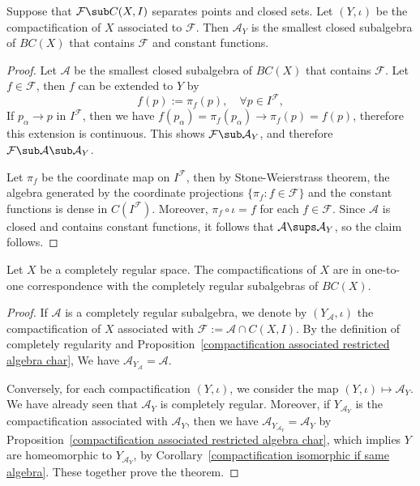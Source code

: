 \begin{proposition}\label{compactification associated restricted algebra char}
Suppose that $\mathcal{F}\sub C(X,I)$ separates points and closed sets. Let $(Y,\iota)$ be the compactification of $X$ associated to $\mathcal{F}$. Then $\mathcal{A}_Y$ is the smallest closed subalgebra of $BC(X)$ that contains $\mathcal{F}$ and constant functions.
\end{proposition}
\begin{proof}
Let $\mathcal{A}$ be the smallest closed subalgebra of $BC(X)$ that contains $\mathcal{F}$. Let $f\in\mathcal{F}$, then $f$ can be extended to $Y$ by
\[f(p):=\pi_f(p),\quad\forall p\in I^\mathcal{F},\]
If $p_\alpha\to p$ in $I^\mathcal{F}$, then we have $f(p_\alpha)=\pi_f(p_\alpha)\to\pi_f(p)=f(p)$, therefore this extension is continuous. This shows $\mathcal{F}\sub\mathcal{A}_Y$, and therefore $\mathcal{F}\sub\mathcal{A}\sub\mathcal{A}_Y$.\par
Let $\pi_f$ be the coordinate map on $I^\mathcal{F}$, then by Stone-Weierstrass theorem, the algebra generated by the coordinate projections $\{\pi_f:f\in\mathcal{F}\}$ and the constant functions is dense in $C(I^\mathcal{F})$. Moreover, $\pi_f\circ\iota=f$ for each $f\in\mathcal{F}$. Since $\mathcal{A}$ is closed and contains constant functions, it follows that $\mathcal{A}\sups\mathcal{A}_Y$, so the claim follows.
\end{proof}
\begin{theorem}
Let $X$ be a completely regular space. The compactifications of $X$ are in one-to-one correspondence with the completely regular subalgebras of $BC(X)$.
\end{theorem}
\begin{proof}
If $\mathcal{A}$ is a completely regular subalgebra, we denote by $(Y_{\mathcal{A}},\iota)$ the compactification of $X$ associated with $\mathcal{F}:=\mathcal{A}\cap C(X,I)$. By the definition of completely regularity and Proposition~\ref{compactification associated restricted algebra char}, We have $\mathcal{A}_{Y_{\mathcal{A}}}=\mathcal{A}$.\par
Conversely, for each compactification $(Y,\iota)$, we consider the map $(Y,\iota)\mapsto\mathcal{A}_Y$. We have already seen that $\mathcal{A}_Y$ is completely regular. Moreover, if $Y_{\mathcal{A}_Y}$ is the compactification associated with $\mathcal{A}_Y$, then we have $\mathcal{A}_{Y_{\mathcal{A}_Y}}=\mathcal{A}_Y$ by Proposition~\ref{compactification associated restricted algebra char}, which implies $Y$ are homeomorphic to $Y_{\mathcal{A}_Y}$, by Corollary~\ref{compactification isomorphic if same algebra}. These together prove the theorem.
\end{proof}
